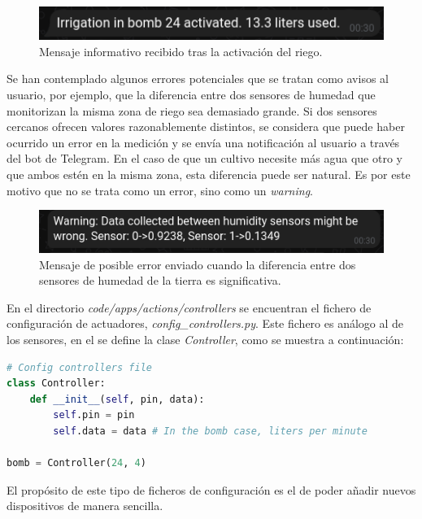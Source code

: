 \documentclass[a4paper, 12pt, oneside]{book}
\begin{document}
\begin{figure}[H]
	\centering
    \includegraphics[width=12cm, keepaspectratio]{img/mensaje_riego}
    \caption{Mensaje informativo recibido tras la activación del riego.}
    \label{figura:mensaje riego}
\end{figure} 

Se han contemplado algunos errores potenciales que se tratan como avisos al usuario, por ejemplo, que la diferencia entre dos sensores de humedad que monitorizan la misma zona de riego sea demasiado grande. 
Si dos sensores cercanos ofrecen valores razonablemente distintos, se considera que puede haber ocurrido un error en la medición y se envía una notificación al usuario a través del bot de Telegram.
En el caso de que un cultivo necesite más agua que otro y que ambos estén en la misma zona, esta diferencia puede ser natural. Es por este motivo que no se trata como un error, sino como un \textit{warning}.

\begin{figure}[H]
	\centering
    \includegraphics[width=12cm, keepaspectratio]{img/warning_humedad_tierra}
    \caption{Mensaje de posible error enviado cuando la diferencia entre dos sensores de humedad de la tierra es significativa.}
    \label{figura:diferencia de sensores}
\end{figure}

En el directorio \textit{code/apps/actions/controllers} se encuentran el fichero de configuración de actuadores, \textit{config\_controllers.py}. Este fichero es análogo al de los sensores, en el se define la clase \textit{Controller}, como se muestra a continuación:  

\begin{lstlisting}[language=Python]
# Config controllers file
class Controller:
    def __init__(self, pin, data):
        self.pin = pin
        self.data = data # In the bomb case, liters per minute

bomb = Controller(24, 4)
\end{lstlisting}

El propósito de este tipo de ficheros de configuración es el de poder añadir nuevos dispositivos de manera sencilla. 
\end{document}
